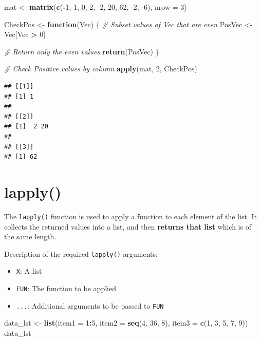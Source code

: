 \documentclass[
]{book}
\newenvironment{Shaded}{\begin{snugshade}}{\end{snugshade}}
\newcommand{\CommentTok}[1]{\textcolor[rgb]{0.56,0.35,0.01}{\textit{#1}}}
\newcommand{\ControlFlowTok}[1]{\textcolor[rgb]{0.13,0.29,0.53}{\textbf{#1}}}
\newcommand{\DataTypeTok}[1]{\textcolor[rgb]{0.13,0.29,0.53}{#1}}
\newcommand{\DecValTok}[1]{\textcolor[rgb]{0.00,0.00,0.81}{#1}}
\newcommand{\KeywordTok}[1]{\textcolor[rgb]{0.13,0.29,0.53}{\textbf{#1}}}
\newcommand{\NormalTok}[1]{#1}
\newcommand{\OperatorTok}[1]{\textcolor[rgb]{0.81,0.36,0.00}{\textbf{#1}}}
\newcommand{\StringTok}[1]{\textcolor[rgb]{0.31,0.60,0.02}{#1}}
\providecommand{\tightlist}{%
  \setlength{\itemsep}{0pt}\setlength{\parskip}{0pt}}
\begin{document}
\begin{Shaded}
\begin{Highlighting}[]
\NormalTok{mat <-}\StringTok{ }\KeywordTok{matrix}\NormalTok{(}\KeywordTok{c}\NormalTok{(}\OperatorTok{-}\DecValTok{1}\NormalTok{, }\DecValTok{1}\NormalTok{, }\DecValTok{0}\NormalTok{, }\DecValTok{2}\NormalTok{, }\DecValTok{-2}\NormalTok{, }\DecValTok{20}\NormalTok{, }\DecValTok{62}\NormalTok{, }\DecValTok{-2}\NormalTok{, }\DecValTok{-6}\NormalTok{), }\DataTypeTok{nrow =} \DecValTok{3}\NormalTok{)}

\NormalTok{CheckPos <-}\StringTok{ }\ControlFlowTok{function}\NormalTok{(Vec) \{}
    \CommentTok{# Subset values of Vec that are even}
\NormalTok{    PosVec <-}\StringTok{ }\NormalTok{Vec[Vec }\OperatorTok{>}\StringTok{ }\DecValTok{0}\NormalTok{]}

    \CommentTok{# Return only the even values}
    \KeywordTok{return}\NormalTok{(PosVec)}
\NormalTok{\}}

\CommentTok{# Check Positive values by column}
\KeywordTok{apply}\NormalTok{(mat, }\DecValTok{2}\NormalTok{, CheckPos)}
\end{Highlighting}
\end{Shaded}

\begin{verbatim}
## [[1]]
## [1] 1
## 
## [[2]]
## [1]  2 20
## 
## [[3]]
## [1] 62
\end{verbatim}

\hypertarget{lapply}{%
\section{lapply()}\label{lapply}}

The \texttt{lapply()} function is used to apply a function to each element of the list. It collects the returned values into a list, and then \textbf{returns that list} which is of the same length.

Description of the required \texttt{lapply()} arguments:

\begin{itemize}
\tightlist
\item
  \texttt{X}: A list
\item
  \texttt{FUN}: The function to be applied
\item
  \texttt{...}: Additional arguments to be passed to \texttt{FUN}
\end{itemize}

\begin{Shaded}
\begin{Highlighting}[]
\NormalTok{data_lst <-}\StringTok{ }\KeywordTok{list}\NormalTok{(}\DataTypeTok{item1 =} \DecValTok{1}\OperatorTok{:}\DecValTok{5}\NormalTok{, }\DataTypeTok{item2 =} \KeywordTok{seq}\NormalTok{(}\DecValTok{4}\NormalTok{, }\DecValTok{36}\NormalTok{, }\DecValTok{8}\NormalTok{), }\DataTypeTok{item3 =} \KeywordTok{c}\NormalTok{(}\DecValTok{1}\NormalTok{,}
    \DecValTok{3}\NormalTok{, }\DecValTok{5}\NormalTok{, }\DecValTok{7}\NormalTok{, }\DecValTok{9}\NormalTok{))}
\NormalTok{data_lst}
\end{Highlighting}
\end{Shaded}
\end{document}

